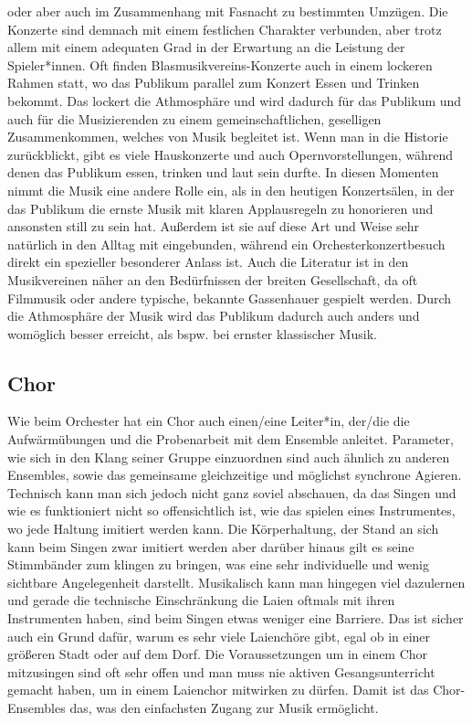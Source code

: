 oder aber auch im Zusammenhang mit Fasnacht zu bestimmten Umzügen. Die Konzerte
sind demnach mit einem festlichen Charakter verbunden, aber trotz allem mit
einem adequaten Grad in der Erwartung an die Leistung der Spieler*innen. Oft
finden Blasmusikvereins-Konzerte auch in einem lockeren Rahmen statt, wo das
Publikum parallel zum Konzert Essen und Trinken bekommt. Das lockert die
Athmosphäre und wird dadurch für das Publikum und auch für die Musizierenden zu
einem gemeinschaftlichen, geselligen Zusammenkommen, welches von Musik begleitet
ist. Wenn man in die Historie zurückblickt, gibt es viele Hauskonzerte und auch
Opernvorstellungen, während denen das Publikum essen, trinken und laut sein
durfte. In diesen Momenten nimmt die Musik eine andere Rolle ein, als in den heutigen
Konzertsälen, in der das Publikum die ernste Musik mit klaren Applausregeln zu
honorieren und ansonsten still zu sein hat. Außerdem ist sie auf diese Art und
Weise sehr natürlich in den Alltag mit eingebunden, während ein
Orchesterkonzertbesuch direkt ein spezieller besonderer Anlass ist. Auch die
Literatur ist in den Musikvereinen näher an den Bedürfnissen der breiten
Gesellschaft, da oft Filmmusik oder andere typische, bekannte Gassenhauer
gespielt werden. Durch die Athmosphäre der Musik wird das Publikum dadurch auch
anders und womöglich besser erreicht, als bspw. bei ernster klassischer Musik. 



\subsection{Chor}

Wie beim Orchester hat ein Chor auch einen/eine Leiter*in, der/die
die Aufwärmübungen und die Probenarbeit mit dem Ensemble anleitet. Parameter,
wie sich in den Klang seiner Gruppe einzuordnen sind auch ähnlich zu anderen
Ensembles, sowie das gemeinsame gleichzeitige und möglichst synchrone Agieren.
Technisch kann man sich jedoch nicht ganz soviel abschauen, da das Singen und
wie es funktioniert nicht so offensichtlich ist, wie das spielen eines
Instrumentes, wo jede Haltung imitiert werden kann. Die Körperhaltung, der Stand
an sich kann beim Singen zwar imitiert werden aber darüber hinaus gilt es seine
Stimmbänder zum klingen zu bringen, was eine sehr individuelle und wenig
sichtbare Angelegenheit darstellt. Musikalisch kann man hingegen viel dazulernen
und gerade die technische Einschränkung die Laien oftmals mit ihren Instrumenten
haben, sind beim Singen etwas weniger eine Barriere. Das ist sicher auch ein
Grund dafür, warum es sehr viele Laienchöre gibt, egal ob in einer größeren
Stadt oder auf dem Dorf. Die Voraussetzungen um in einem Chor mitzusingen sind
oft sehr offen und man muss nie aktiven Gesangsunterricht gemacht haben, um in
einem Laienchor mitwirken zu dürfen. Damit ist das Chor-Ensembles das, was den
einfachsten Zugang zur Musik ermöglicht. 



